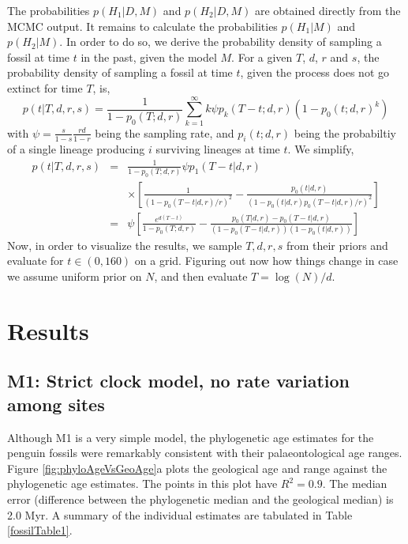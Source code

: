 \documentclass[11pt]{article}
\newcommand{\Mstrict}{{M1}}
\begin{document}
The probabilities $p(H_1|D,M)$ and $p(H_2|D,M)$ are obtained directly from the MCMC output.
It remains to calculate the probabilities $p(H_1|M)$ and $p(H_2|M)$.
In order to do so, we derive the probability density of sampling a fossil at time $t$ in the past, given the model $M$. 
For a given $T$, $d$, $r$ and $s$, the probability density of sampling a fossil at time $t$, given the process does not go extinct for time $T$, is,
$$p(t|T,d,r,s) = \frac{1}{1-p_0(T;d,r)} \sum_{k=1}^\infty k \psi p_k(T-t;d,r) (1-p_0(t;d,r)^k)$$
with $\psi=\frac{s}{1-s} \frac{rd}{1-r}$ being the sampling rate, and $p_i(t;d,r)$ being the probabiltiy of a single lineage producing $i$ surviving lineages at time $t$.
We simplify,
\begin{eqnarray*}
p(t|T,d,r,s) &=& \frac{1}{1-p_0(T;d,r)}  \psi p_1(T-t|d,r) \\ & & \times \left[  \frac{1}{(1-p_0(T-t|d,r)/r)^2} - \frac{p_0(t|d,r)}{(1-p_0(t|d,r) p_0(T-t|d,r)/r)^2}  \right]\\
&=&  \psi  \left[ \frac{e^{d(T-t)}}{1-p_0(T;d,r)} - \frac{p_0(T|d,r)-p_0(T-t|d,r)}{(1-p_0(T-t|d,r))(1-p_0(t|d,r))} \right]
\end{eqnarray*}
Now, in order to visualize the results, we sample $T,d,r,s$ from their priors and evaluate for  $t \in (0,160)$ on a grid.
Figuring out now how things change in case we assume uniform prior on $N$, and then evaluate $T=\log(N)/d$.



\section*{Results}


\subsection*{\Mstrict{}: Strict clock model, no rate variation among sites}
Although \Mstrict{} is a very simple model, the phylogenetic age estimates for the penguin fossils were remarkably consistent with their palaeontological age ranges. Figure \ref{fig:phyloAgeVsGeoAge}a plots the geological age and range against the phylogenetic age estimates. The points in this plot have $R^2 = 0.9$. The median error (difference between the phylogenetic median and the geological median) is 2.0 Myr. A summary of the individual estimates are tabulated in Table \ref{fossilTable1}.
\end{document}
